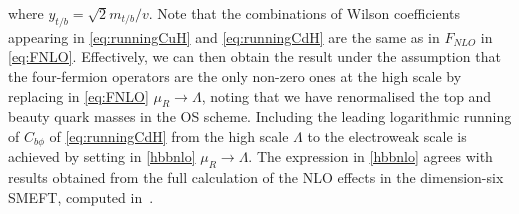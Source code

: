 where $y_{t/b}=\sqrt{2} m_{t/b}/v$.
Note that the combinations of Wilson coefficients appearing in \eqref{eq:runningCuH} and \eqref{eq:runningCdH} are the same as in $F_{NLO}$ in \eqref{eq:FNLO}.
Effectively, we can then obtain the result under the assumption that the four-fermion operators are the only non-zero ones at the high scale by replacing in \eqref{eq:FNLO} $\mu_R \to \Lambda$, noting that we have renormalised the top and beauty quark masses in the OS scheme.
Including the leading logarithmic running of $C_{b\phi}$ of \eqref{eq:runningCdH} from the high scale $\Lambda$ to the electroweak scale is achieved by setting in \eqref{hbbnlo} $\mu_R\to \Lambda$.
The expression in \eqref{hbbnlo} agrees with results obtained from the full calculation of the NLO effects in the dimension-six SMEFT, computed in~\cite{Gauld:2015lmb}. 

